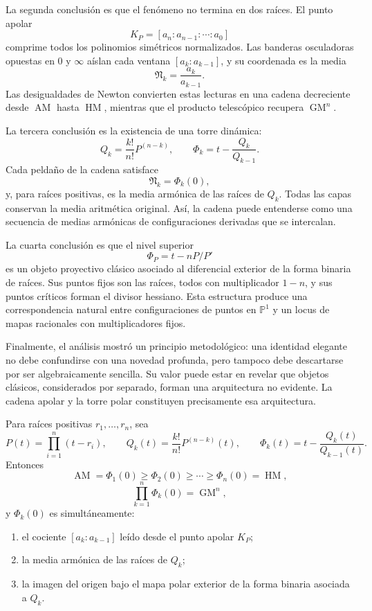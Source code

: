 \documentclass[11pt,oneside]{scrartcl}
\theoremstyle{plainblue}
\theoremstyle{definitionblue}
\theoremstyle{remarkgray}
\newcommand{\PP}{\mathbb{P}}
\newcommand{\AM}{\operatorname{AM}}
\newcommand{\GM}{\operatorname{GM}}
\newcommand{\HM}{\operatorname{HM}}
\newcommand{\cN}{\mathfrak{N}}
\begin{document}
La segunda conclusión es que el fenómeno no termina en dos raíces. El punto apolar
\[
K_P=[a_n:a_{n-1}:\cdots:a_0]
\]
comprime todos los polinomios simétricos normalizados. Las banderas osculadoras
opuestas en \(0\) y \(\infty\) aíslan cada ventana
\([a_k:a_{k-1}]\), y su coordenada es la media
\[
\cN_k=\frac{a_k}{a_{k-1}}.
\]
Las desigualdades de Newton convierten estas lecturas en una cadena decreciente desde
\(\AM\) hasta \(\HM\), mientras que el producto telescópico recupera \(\GM^n\).

La tercera conclusión es la existencia de una torre dinámica:
\[
Q_k=\frac{k!}{n!}P^{(n-k)},
\qquad
\Phi_k=t-\frac{Q_k}{Q_{k-1}}.
\]
Cada peldaño de la cadena satisface
\[
\cN_k=\Phi_k(0),
\]
y, para raíces positivas, es la media armónica de las raíces de \(Q_k\). Todas las
capas conservan la media aritmética original. Así, la cadena puede entenderse como
una secuencia de medias armónicas de configuraciones derivadas que se intercalan.

La cuarta conclusión es que el nivel superior
\[
\Phi_P=t-nP/P'
\]
es un objeto proyectivo clásico asociado al diferencial exterior de la forma binaria
de raíces. Sus puntos fijos son las raíces, todos con multiplicador \(1-n\), y sus
puntos críticos forman el divisor hessiano. Esta estructura produce una
correspondencia natural entre configuraciones de puntos en \(\PP^1\) y un locus de
mapas racionales con multiplicadores fijos.

Finalmente, el análisis mostró un principio metodológico: una identidad elegante no
debe confundirse con una novedad profunda, pero tampoco debe descartarse por ser
algebraicamente sencilla. Su valor puede estar en revelar que objetos clásicos,
considerados por separado, forman una arquitectura no evidente. La cadena apolar y la
torre polar constituyen precisamente esa arquitectura.

\Needspace{0.48\textheight}
\begin{keybox}
Para raíces positivas \(r_1,\dots,r_n\), sea
\[
P(t)=\prod_{i=1}^{n}(t-r_i),
\qquad
Q_k(t)=\frac{k!}{n!}P^{(n-k)}(t),
\qquad
\Phi_k(t)=t-\frac{Q_k(t)}{Q_{k-1}(t)}.
\]
Entonces
\[
\boxed{
\AM=\Phi_1(0)\ge\Phi_2(0)\ge\cdots\ge\Phi_n(0)=\HM,}
\]
\[
\boxed{
\prod_{k=1}^{n}\Phi_k(0)=\GM^n,}
\]
y \(\Phi_k(0)\) es simultáneamente:
\begin{enumerate}[leftmargin=8mm]
\item el cociente \([a_k:a_{k-1}]\) leído desde el punto apolar \(K_P\);
\item la media armónica de las raíces de \(Q_k\);
\item la imagen del origen bajo el mapa polar exterior de la forma binaria asociada a
\(Q_k\).
\end{enumerate}
\end{keybox}
\end{document}

